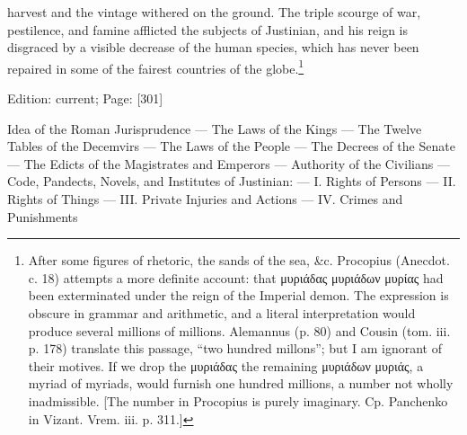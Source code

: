 harvest and the vintage withered on the ground. The triple scourge of war, pestilence, and famine afflicted the subjects of Justinian, and his reign is disgraced by a visible decrease of the human species, which has never been repaired in some of the fairest countries of the globe.\footnote{After some figures of rhetoric, the sands of the sea, \&c. Procopius (Anecdot. c. 18) attempts a more definite account: that \textgreek{μυριάδας μυριάδων μυρίας} had been exterminated under the reign of the Imperial demon. The expression is obscure in grammar and arithmetic, and a literal interpretation would produce several millions of millions. Alemannus (p. 80) and Cousin (tom. iii. p. 178) translate this passage, \texthebrew{“}two hundred millons\texthebrew{}”; but I am ignorant of their motives. If we drop the \textgreek{μυριάδας} the remaining \textgreek{μυριάδων μυριάς}, a myriad of myriads, would furnish one hundred millions, a number not wholly inadmissible. [The number in Procopius is purely imaginary. Cp. Panchenko in Vizant. Vrem. iii. p. 311.]}

Edition: current; Page: [301]


Idea of the Roman Jurisprudence \texthebrew{—} The Laws of the Kings \texthebrew{—} The Twelve Tables of the Decemvirs \texthebrew{—} The Laws of the People \texthebrew{—} The Decrees of the Senate \texthebrew{—} The Edicts of the Magistrates and Emperors \texthebrew{—} Authority of the Civilians \texthebrew{—} Code, Pandects, Novels, and Institutes of Justinian: \texthebrew{—} I. Rights of Persons \texthebrew{—} II. Rights of Things \texthebrew{—} III. Private Injuries and Actions \texthebrew{—} IV. Crimes and Punishments

